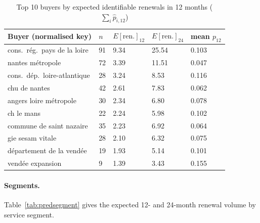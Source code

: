 \documentclass[12pt, a4paper]{article}
\begin{document}
\begin{table}[H]
\centering
\caption{Top 10 buyers by expected identifiable renewals in 12 months
($\sum_i \hat{p}_{i,12}$)}
\label{tab:predtopbuyers}
\small
\begin{tabular}{@{}P{5.0cm}R{1.4cm}R{2.3cm}R{2.3cm}R{1.9cm}@{}}
\toprule
Buyer (normalised key) & $n$ & $E[\text{ren.}]_{12}$ & $E[\text{ren.}]_{24}$ & mean $p_{12}$ \\
\midrule
cons.\ rég.\ pays de la loire     & 91 & 9.34 & 25.54 & 0.103 \\
nantes métropole                  & 72 & 3.39 & 11.51 & 0.047 \\
cons.\ dép.\ loire-atlantique     & 28 & 3.24 &  8.53 & 0.116 \\
chu de nantes                     & 42 & 2.61 &  7.83 & 0.062 \\
angers loire métropole            & 30 & 2.34 &  6.80 & 0.078 \\
ch le mans                        & 22 & 2.24 &  5.98 & 0.102 \\
commune de saint nazaire          & 35 & 2.23 &  6.92 & 0.064 \\
gie sesam vitale                  & 28 & 2.10 &  6.32 & 0.075 \\
département de la vendée          & 19 & 1.93 &  5.14 & 0.101 \\
vendée expansion                  &  9 & 1.39 &  3.43 & 0.155 \\
\bottomrule
\end{tabular}
\normalsize
\end{table}

\paragraph{Segments.} Table~\ref{tab:predsegment} gives the expected 12- and 24-month renewal
volume by service segment.
\end{document}
